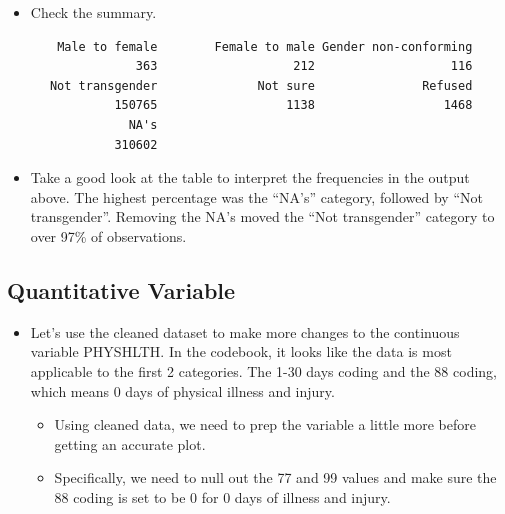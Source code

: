 \documentclass[
  letterpaper,
  DIV=11,
  numbers=noendperiod]{scrreprt}
\newenvironment{Shaded}{\begin{snugshade}}{\end{snugshade}}
\newcommand{\FunctionTok}[1]{\textcolor[rgb]{0.28,0.35,0.67}{#1}}
\newcommand{\NormalTok}[1]{\textcolor[rgb]{0.00,0.23,0.31}{#1}}
\newcommand{\SpecialCharTok}[1]{\textcolor[rgb]{0.37,0.37,0.37}{#1}}
\providecommand{\tightlist}{%
  \setlength{\itemsep}{0pt}\setlength{\parskip}{0pt}}\usepackage{longtable,booktabs,array}
\begin{document}
\begin{itemize}
\tightlist
\item
  Check the summary.
\end{itemize}

\begin{Shaded}
\end{Shaded}

\begin{verbatim}
       Male to female        Female to male Gender non-conforming 
                  363                   212                   116 
      Not transgender              Not sure               Refused 
               150765                  1138                  1468 
                 NA's 
               310602 
\end{verbatim}

\begin{itemize}
\tightlist
\item
  Take a good look at the table to interpret the frequencies in the
  output above. The highest percentage was the ``NA's'' category,
  followed by ``Not transgender''. Removing the NA's moved the ``Not
  transgender'' category to over 97\% of observations.
\end{itemize}

\subsection{Quantitative Variable}\label{quantitative-variable}

\begin{itemize}
\tightlist
\item
  Let's use the cleaned dataset to make more changes to the continuous
  variable PHYSHLTH. In the codebook, it looks like the data is most
  applicable to the first 2 categories. The 1-30 days coding and the 88
  coding, which means 0 days of physical illness and injury.

  \begin{itemize}
  \tightlist
  \item
    Using cleaned data, we need to prep the variable a little more
    before getting an accurate plot.
  \item
    Specifically, we need to null out the 77 and 99 values and make sure
    the 88 coding is set to be 0 for 0 days of illness and injury.
  \end{itemize}
\end{itemize}
\end{document}

